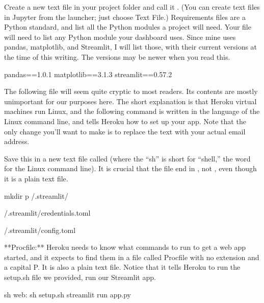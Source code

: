 \documentclass[letterpaper,10pt,english]{sphinxmanual}
\begin{document}
 Create a new text file in your project folder and call it .  (You can create text files in Jupyter from the launcher; just choose Text File.)  Requirements files are a Python standard, and list all the Python modules a project will need.  Your  file will need to list any Python module your dashboard uses.  Since mine uses pandas, matplotlib, and Streamlit, I will list those, with their current versions at the time of this writing.  The versions may be newer when you read this.

\begin{sphinxVerbatim}[commandchars=\\\{\}]
pandas==1.0.1
matplotlib==3.1.3
streamlit==0.57.2
\end{sphinxVerbatim}

 The following file will seem quite cryptic to most readers.  Its contents are mostly unimportant for our purposes here.  The short explanation is that Heroku virtual machines run Linux, and the following command is written in the language of the Linux command line, and tells Heroku how to set up your app.  Note that the only change you’ll want to make is to replace the text  with your actual email address.

Save this in a new text file called  (where the “sh” is short for “shell,” the word for the Linux command line).  It is crucial that the file end in , not , even though it is a plain text file.

\begin{sphinxVerbatim}[commandchars=\\\{\}]
mkdir \PYGZhy{}p \PYGZti{}/.streamlit/

 
 \PYGZgt{} \PYGZti{}/.streamlit/credentials.toml

 
 \PYGZgt{} \PYGZti{}/.streamlit/config.toml

**Procfile:** Heroku needs to know what commands to run to get a web app started, and it expects to find them in a file called Procfile with no extension and a capital P.  It is also a plain text file.  Notice that it tells Heroku to run the setup.sh file we provided,  run our Streamlit app.

sh
web: sh setup.sh  streamlit run app.py
\end{sphinxVerbatim}
\end{document}
